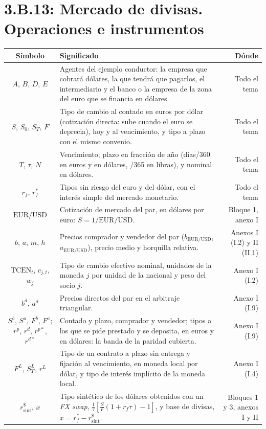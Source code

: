 \documentclass[10pt,a4paper]{article}
\newcommand{\cabecera}{\toprule\textbf{Símbolo} & \textbf{Significado} & \textbf{Dónde}\\\midrule\endhead\bottomrule\endfoot}
\begin{document}
\section{3.B.13: Mercado de divisas. Operaciones e instrumentos}
\begin{longtable}{SMD}
\cabecera
$A$, $B$, $D$, $E$ & Agentes del ejemplo conductor: la empresa que cobrará dólares, la que tendrá que pagarlos, el intermediario y el banco o la empresa de la zona del euro que se financia en dólares. & Todo el tema\\
$S$, $S_0$, $S_T$, $F$ & Tipo de cambio al contado en euros por dólar (cotización directa: sube cuando el euro se deprecia), hoy y al vencimiento, y tipo a plazo con el mismo convenio. & Todo el tema\\
$T$, $\tau$, $N$ & Vencimiento; plazo en fracción de año (días/360 en euros y en dólares, /365 en libras), y nominal en dólares. & Todo el tema\\
$r_f$, $r_f^*$ & Tipos sin riesgo del euro y del dólar, con el interés simple del mercado monetario. & Todo el tema\\
$\mathrm{EUR/USD}$ & Cotización de mercado del par, en dólares por euro: $S=1/\mathrm{EUR/USD}$. & Bloque 1, anexo I\\
$b$, $a$, $m$, $h$ & Precios comprador y vendedor del par ($b_{\mathrm{EUR/USD}}$, $a_{\mathrm{EUR/USD}}$), precio medio y horquilla relativa. & Anexos I (I.2) y II (II.1)\\
$\mathrm{TCEN}_t$, $c_{j,t}$, $w_j$ & Tipo de cambio efectivo nominal, unidades de la moneda $j$ por unidad de la nacional y peso del socio $j$. & Anexo I (I.2)\\
$b^{d}$, $a^{d}$ & Precios directos del par en el arbitraje triangular. & Anexo I (I.9)\\
$S^{b}$, $S^{a}$, $F^{b}$, $F^{a}$; $r^{p}$, $r^{d}$, $r^{p*}$, $r^{d*}$ & Contado y plazo, comprador y vendedor; tipos a los que se pide prestado y se deposita, en euros y en dólares: la banda de la paridad cubierta. & Anexo I (I.9)\\
$F^{L}$, $S^{L}_T$, $r^{L}$ & Tipo de un contrato a plazo sin entrega y fijación al vencimiento, en moneda local por dólar, y tipo de interés implícito de la moneda local. & Anexo I (I.4)\\
$r^{\$}_{\mathrm{sint}}$, $x$ & Tipo sintético de los dólares obtenidos con un \textit{FX swap}, $\frac{1}{\tau}\left[\frac{S}{F}(1+r_f\tau)-1\right]$, y base de divisas, $x=r_f^*-r^{\$}_{\mathrm{sint}}$. & Bloques 1 y 3, anexos I y II\\

\end{longtable}
\end{document}

